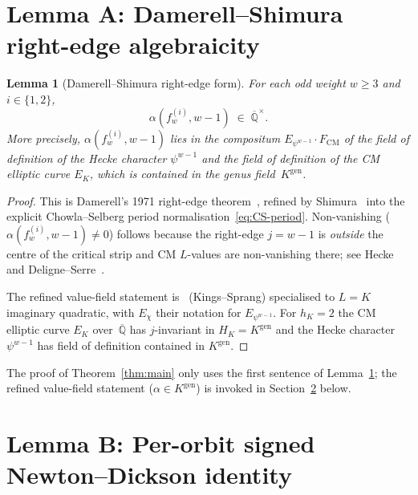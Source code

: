 \documentclass[11pt,a4paper]{amsart}
\theoremstyle{plain}
\newtheorem{lemma}[theorem]{Lemma}
\theoremstyle{definition}
\newcommand{\Q}{\mathbb{Q}}
\newcommand{\HK}{H_K}
\newcommand{\Kgen}{K^{\mathrm{gen}}}
\newcommand{\Qbar}{\overline{\Q}}
\newcommand{\fl}[2]{f_{#1}^{(#2)}}
\begin{document}
\section{Lemma A: Damerell--Shimura right-edge algebraicity}\label{sec:lemma-A}

\begin{lemma}[Damerell--Shimura right-edge form]\label{lem:A}
For each odd weight $w \ge 3$ and $i \in \{1, 2\}$,
\[
   \alpha(\fl{w}{i}, w-1) \;\in\; \Qbar^\times.
\]
More precisely, $\alpha(\fl{w}{i}, w-1)$ lies in the compositum
$E_{\psi^{w-1}} \cdot F_{\mathrm{CM}}$ of the field of definition of
the Hecke character $\psi^{w-1}$ and the field of definition of the
CM elliptic curve $E_K$, which is contained in the genus field~$\Kgen$.
\end{lemma}

\begin{proof}
This is Damerell's 1971 right-edge theorem~\cite[Thm.~1]{Damerell1971a},
refined by Shimura~\cite[Thm.~1, Thm.~4]{Shimura1976} into the
explicit Chowla--Selberg period
normalisation~\eqref{eq:CS-period}.  Non-vanishing
($\alpha(\fl{w}{i}, w-1) \ne 0$) follows because the right-edge
$j = w-1$ is \emph{outside} the centre of the critical strip and CM
$L$-values are non-vanishing there; see Hecke~\cite{Hecke1936} and
Deligne--Serre~\cite{DeligneSerre1974}.

The refined value-field statement is~\cite[Thm.~1.1.1, Cor.~2.4]{KingsSprang2025}
(Kings--Sprang) specialised to $L = K$ imaginary quadratic, with $E_\chi$
their notation for $E_{\psi^{w-1}}$.  For $h_K = 2$ the CM elliptic
curve $E_K$ over~$\Qbar$ has $j$-invariant in $\HK = \Kgen$ and the
Hecke character $\psi^{w-1}$ has field of definition contained in
$\Kgen$.
\end{proof}

The proof of Theorem~\ref{thm:main} only uses the first sentence
of Lemma~\ref{lem:A}; the refined value-field statement
($\alpha \in \Kgen$) is invoked in Section~\ref{sec:lemma-B} below.

\section{Lemma B: Per-orbit signed Newton--Dickson identity}\label{sec:lemma-B}
\end{document}
